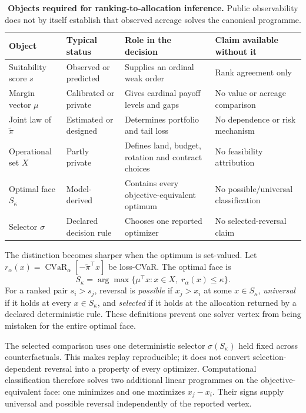 \begin{table}[t]
\centering
\caption{\textbf{Objects required for ranking-to-allocation inference.} Public observability does not by itself establish that observed acreage solves the canonical programme.}
\label{tab:objects}
\small
\begin{tabularx}{\textwidth}{>{\raggedright\arraybackslash}p{2.7cm}>{\raggedright\arraybackslash}p{3.1cm}>{\raggedright\arraybackslash}X>{\raggedright\arraybackslash}p{2.9cm}}
\toprule
Object & Typical status & Role in the decision & Claim available without it \\
\midrule
Suitability score $s$ & Observed or predicted & Supplies an ordinal weak order & Rank agreement only \\
Margin vector $\mu$ & Calibrated or private & Gives cardinal payoff levels and gaps & No value or acreage comparison \\
Joint law of $\widetilde\pi$ & Estimated or designed & Determines portfolio and tail loss & No dependence or risk mechanism \\
Operational set $X$ & Partly private & Defines land, budget, rotation and contract choices & No feasibility attribution \\
Optimal face $S_\kappa$ & Model-derived & Contains every objective-equivalent optimum & No possible/universal classification \\
Selector $\sigma$ & Declared decision rule & Chooses one reported optimizer & No selected-reversal claim \\
\bottomrule
\end{tabularx}
\end{table}

The distinction becomes sharper when the optimum is set-valued. Let $r_\alpha(x)=\operatorname{CVaR}_\alpha[-\widetilde\pi^\top x]$ be loss-CVaR. The optimal face is
\begin{equation}
S_\kappa=\arg\max\{\mu^\top x:x\in X,\;r_\alpha(x)\leq\kappa\}.
\end{equation}
For a ranked pair $s_i>s_j$, reversal is \emph{possible} if $x_j>x_i$ at some $x\in S_\kappa$, \emph{universal} if it holds at every $x\in S_\kappa$, and \emph{selected} if it holds at the allocation returned by a declared deterministic rule. These definitions prevent one solver vertex from being mistaken for the entire optimal face.

The selected comparison uses one deterministic selector $\sigma(S_\kappa)$ held fixed across counterfactuals. This makes replay reproducible; it does not convert selection-dependent reversal into a property of every optimizer. Computational classification therefore solves two additional linear programmes on the objective-equivalent face: one minimizes and one maximizes $x_j-x_i$. Their signs supply universal and possible reversal independently of the reported vertex.

